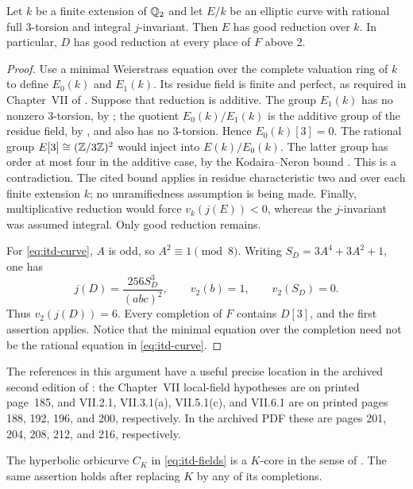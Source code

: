 \begin{lemma}\label{lem:itd-two}
Let $k$ be a finite extension of $\mathbb Q_2$ and let $E/k$ be an elliptic
curve with rational full $3$-torsion and integral $j$-invariant. Then
$E$ has good reduction over $k$. In particular, $D$ has good reduction
at every place of $F$ above 2.
\end{lemma}

\begin{proof}
Use a minimal Weierstrass equation over the complete valuation ring
of $k$ to define $E_0(k)$ and $E_1(k)$. Its residue field is finite
and perfect, as required in Chapter~VII of \cite{Silverman}.
Suppose that reduction is additive. The group $E_1(k)$ has no
nonzero $3$-torsion, by \cite[VII.3.1(a)]{Silverman}; the quotient
$E_0(k)/E_1(k)$ is the additive group of the residue field, by
\cite[VII.2.1 and VII.5.1(c)]{Silverman}, and also has no
$3$-torsion. Hence $E_0(k)[3]=0$. The rational group
$E[3]\cong(\mathbb Z/3\mathbb Z)^2$ would inject into $E(k)/E_0(k)$.
The latter group has order at most four in the additive case, by
the Kodaira--Neron bound \cite[VII.6.1]{Silverman}. This is a
contradiction. The cited bound applies in residue characteristic two
and over each finite extension $k$; no unramifiedness assumption is
being made. Finally, multiplicative reduction would force
$v_k(j(E))<0$, whereas the $j$-invariant was assumed integral.
Only good reduction remains.

For \eqref{eq:itd-curve}, $A$ is odd, so $A^2\equiv1\pmod8$.
Writing $S_D=3A^4+3A^2+1$, one has
\[
 j(D)=\frac{256S_D^3}{(abc)^2},\qquad
 v_2(b)=1,\qquad v_2(S_D)=0.
\]
Thus $v_2(j(D))=6$. Every completion of $F$ contains $D[3]$, and
the first assertion applies. Notice that the minimal equation over
the completion need not be the rational equation in
\eqref{eq:itd-curve}.
\end{proof}

The references in this argument have a useful precise location in
the archived second edition of \cite{Silverman}: the Chapter~VII
local-field hypotheses are on printed page~185, and VII.2.1,
VII.3.1(a), VII.5.1(c), and VII.6.1 are on printed pages
188, 192, 196, and 200, respectively. In the archived PDF these are
pages 201, 204, 208, 212, and 216, respectively.

\begin{proposition}\label{prop:itd-core}
The hyperbolic orbicurve $C_K$ in \eqref{eq:itd-fields} is a
$K$-core in the sense of \cite[Remark~2.1.1]{MochCanLift}.
The same assertion holds after replacing $K$ by any of its
completions.
\end{proposition}


